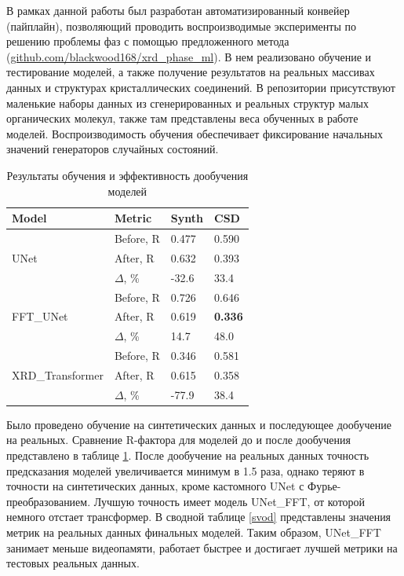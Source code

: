 В рамках данной работы был разработан автоматизированный конвейер (пайплайн), позволяющий проводить воспроизводимые эксперименты по решению проблемы фаз с помощью предложенного метода (\url{github.com/blackwood168/xrd_phase_ml}). В нем реализовано обучение и тестирование моделей, а также получение результатов на реальных массивах данных и структурах кристаллических соединений. В репозитории присутствуют маленькие наборы данных из сгенерированных и реальных структур малых органических молекул, также там представлены веса обученных в работе моделей. Воспроизводимость обучения обеспечивает фиксирование начальных значений генераторов случайных состояний.

\begin{table}[H]
\caption{Результаты обучения и эффективность дообучения моделей}
\label{doposle}
\centering
\footnotesize
\begin{tabular}{|l|l|l|l|} 
\hline
\textbf{Model} & \textbf{Metric} & \textbf{Synth} & \textbf{CSD}  \\ 
\hline
\multirow{3}{*}{UNet} 
& Before, R & 0.477 & 0.590 \\ 
& After, R  & 0.632 & 0.393 \\ 
& $\Delta$, \%       & -32.6 & 33.4  \\
\hline
\multirow{3}{*}{FFT\_UNet}
& Before, R & 0.726 & 0.646 \\ 
& After, R  & 0.619 & \textbf{0.336} \\ 
& $\Delta$, \%       & 14.7  & 48.0  \\
\hline
\multirow{3}{*}{XRD\_Transformer}
& Before, R & 0.346 & 0.581 \\ 
& After, R  & 0.615 & 0.358 \\ 
& $\Delta$, \%       & -77.9 & 38.4  \\
\hline
\end{tabular}
\end{table}

Было проведено обучение на синтетических данных и последующее дообучение на реальных. Сравнение R-фактора для моделей до и после дообучения представлено в таблице \ref{doposle}. После дообучение на реальных данных точность предсказания моделей увеличивается минимум в 1.5 раза, однако теряют в точности на синтетических данных, кроме кастомного UNet с Фурье-преобразованием. Лучшую точность имеет модель UNet\_FFT, от которой немного отстает трансформер. В сводной таблице \ref{svod} представлены значения метрик на реальных данных финальных моделей. Таким образом, UNet\_FFT занимает меньше видеопамяти, работает быстрее и достигает лучшей метрики на тестовых реальных данных.


